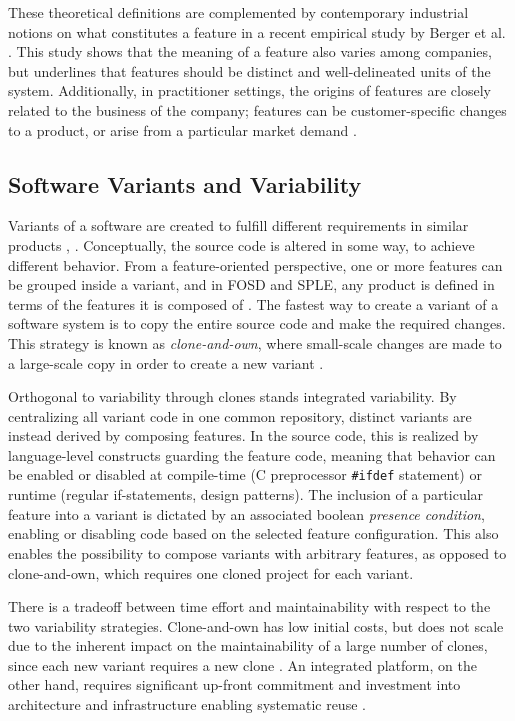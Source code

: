 These theoretical definitions are complemented by contemporary industrial notions on what constitutes a feature in a recent empirical study by Berger et al. \cite{berger2015feature}. This study shows that the meaning of a feature also varies among companies, but underlines that features should be distinct and well-delineated units of the system. Additionally, in practitioner settings, the origins of features are closely related to the business of the company; features can be customer-specific changes to a product, or arise from a particular market demand \cite{berger2015feature}.

\subsection{Software Variants and Variability}
Variants of a software are created to fulfill different requirements in similar products \cite{antkiewicz2014flexible}, \cite{stanciulescu2015}. Conceptually, the source code is altered in some way, to achieve different behavior. From a feature-oriented perspective, one or more features can be grouped inside a variant, and in FOSD and SPLE, any product is defined in terms of the features it is composed of \cite{apel2009overview}. The fastest way to create a variant of a software system is to copy the entire source code and make the required changes. This strategy is known as \textit{clone-and-own}, where small-scale changes are made to a large-scale copy in order to create a new variant \cite{stanciulescu2015}.

Orthogonal to variability through clones stands integrated variability. By centralizing all variant code in one common repository, distinct variants are instead derived by composing features. In the source code, this is realized by language-level constructs guarding the feature code, meaning that behavior can be enabled or disabled at compile-time (C preprocessor \texttt{\#ifdef} statement) or runtime (regular if-statements, design patterns). The inclusion of a particular feature into a variant is dictated by an associated boolean \textit{presence condition}, enabling or disabling code based on the selected feature configuration. This also enables the possibility to compose variants with arbitrary features, as opposed to clone-and-own, which requires one cloned project for each variant.

There is a tradeoff between time effort and maintainability with respect to the two variability strategies. Clone-and-own has low initial costs, but does not scale due to the inherent impact on the maintainability of a large number of clones, since each new variant requires a new clone \cite{antkiewicz2014flexible}. An integrated platform, on the other hand, requires significant up-front commitment and investment into architecture and infrastructure enabling systematic reuse \cite{antkiewicz2014flexible}.

